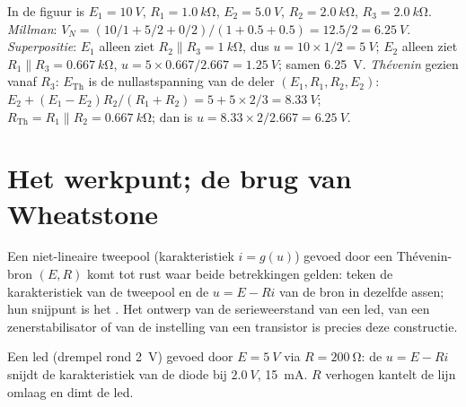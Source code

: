 \begin{example}\label{ex:b1:dc-circuits:threeways}
In de figuur is $E_1 = \qty{10}{V}$, $R_1 = \qty{1.0}{k\ohm}$, $E_2 =
\qty{5.0}{V}$, $R_2 = \qty{2.0}{k\ohm}$, $R_3 = \qty{2.0}{k\ohm}$.
\emph{Millman}: $V_N = (10/1 + 5/2 + 0/2)/(1 + 0.5 + 0.5) = 12.5/2 =
\qty{6.25}{V}$. \emph{Superpositie}: $E_1$ alleen ziet $R_2 \parallel
R_3 = \qty{1}{k\ohm}$, dus $u = 10 \times 1/2 = \qty{5}{V}$; $E_2$ alleen
ziet $R_1 \parallel R_3 = \qty{0.667}{k\ohm}$, $u = 5 \times 0.667/2.667
= \qty{1.25}{V}$; samen \qty{6.25}{V}. \emph{Thévenin} gezien vanaf
$R_3$: $E_{\mathrm{Th}}$ is de nullastspanning van de deler
$(E_1, R_1, R_2, E_2)$: $E_2 + (E_1 - E_2)R_2/(R_1 + R_2) = 5 + 5 \times
2/3 = \qty{8.33}{V}$; $R_{\mathrm{Th}} = R_1 \parallel R_2 =
\qty{0.667}{k\ohm}$; dan is $u = 8.33 \times 2/2.667 = \qty{6.25}{V}$.
\end{example}

\section{Het werkpunt; de brug van Wheatstone}

\begin{method}\label{met:b1:dc-circuits:loadline}
Een niet-lineaire tweepool (karakteristiek $i = g(u)$) gevoed door een
Thévenin-bron $(E, R)$ komt tot rust waar beide betrekkingen gelden: teken de
karakteristiek van de tweepool en de \emph{} $u = E - Ri$ van de bron in
dezelfde assen; hun snijpunt is het \emph{}. Het ontwerp van de
serieweerstand van een led, van een zenerstabilisator of van de instelling van
een transistor is precies deze constructie.
\end{method}

\begin{omfigure}

{\small Een led (drempel rond \qty{2}{V}) gevoed door $E = \qty{5}{V}$
via $R = \qty{200}{\ohm}$: de  $u = E - Ri$ snijdt de
karakteristiek van de diode bij $\qty{2.0}{V}$, \qty{15}{mA}. $R$ verhogen
kantelt de lijn omlaag en dimt de led.}
\end{omfigure}

